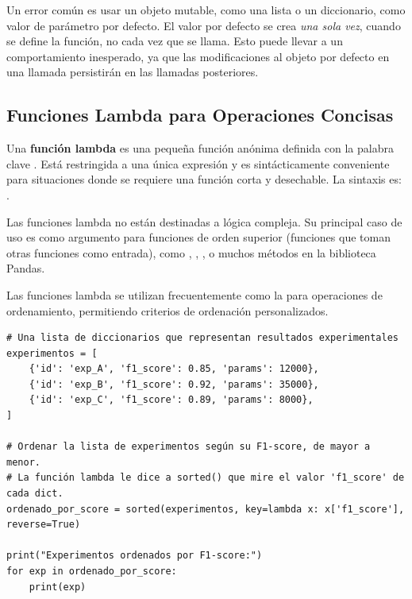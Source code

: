 \begin{remark}
Un error común es usar un objeto mutable, como una lista o un diccionario, como valor de parámetro por defecto. El valor por defecto se crea \textit{una sola vez}, cuando se define la función, no cada vez que se llama. Esto puede llevar a un comportamiento inesperado, ya que las modificaciones al objeto por defecto en una llamada persistirán en las llamadas posteriores.
\end{remark}

\subsection{Funciones Lambda para Operaciones Concisas}
\label{subsec:lambda}
Una \textbf{función lambda} es una pequeña función anónima definida con la palabra clave . Está restringida a una única expresión y es sintácticamente conveniente para situaciones donde se requiere una función corta y desechable.
La sintaxis es: .

Las funciones lambda no están destinadas a lógica compleja. Su principal caso de uso es como argumento para funciones de orden superior (funciones que toman otras funciones como entrada), como , , , o muchos métodos en la biblioteca Pandas.

\begin{example}
Las funciones lambda se utilizan frecuentemente como la  para operaciones de ordenamiento, permitiendo criterios de ordenación personalizados.
\text{ }\begin{verbatim}
# Una lista de diccionarios que representan resultados experimentales
experimentos = [
    {'id': 'exp_A', 'f1_score': 0.85, 'params': 12000},
    {'id': 'exp_B', 'f1_score': 0.92, 'params': 35000},
    {'id': 'exp_C', 'f1_score': 0.89, 'params': 8000},
]

# Ordenar la lista de experimentos según su F1-score, de mayor a menor.
# La función lambda le dice a sorted() que mire el valor 'f1_score' de cada dict.
ordenado_por_score = sorted(experimentos, key=lambda x: x['f1_score'], reverse=True)

print("Experimentos ordenados por F1-score:")
for exp in ordenado_por_score:
    print(exp)
\end{verbatim}
\end{example}

